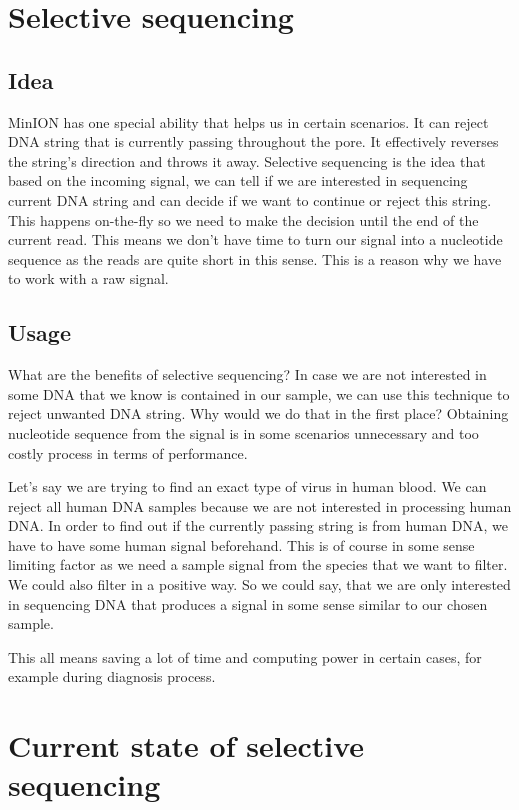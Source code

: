 \section{Selective sequencing}

\subsection{Idea}

MinION has one special ability that helps us in certain scenarios. It can reject
DNA string that is currently passing throughout the pore. It effectively reverses
the string’s direction and throws it away. Selective sequencing is the idea that
based on the incoming signal, we can tell if we are interested in sequencing current
DNA string and can decide if we want to continue or reject this string. This happens
on-the-fly so we need to make the decision until the end of the current read. This means
we don't have time to turn our signal into a nucleotide sequence as the reads are
quite short in this sense. This is a reason why we have to work with a raw signal.

\subsection{Usage}

What are the benefits of selective sequencing? In case we are not interested
in some DNA that we know is contained in our sample, we can use this technique to
reject unwanted DNA string. Why would we do that in the first place? Obtaining
nucleotide sequence from the signal is in some scenarios unnecessary and too
costly process in terms of performance. 

Let's say we are trying to find an exact type of virus in human blood. We can
reject all human DNA samples because we are not interested in processing human
DNA. In order to find out if the currently passing string is from human DNA, we
have to have some human signal beforehand. This is of course in some sense limiting
factor as we need a sample signal from the species that we want to filter. We could
also filter in a positive way. So we could say, that we are only interested in sequencing
DNA that produces a signal in some sense similar to our chosen sample.

This all means saving a lot of time and computing power in certain cases, for example
during diagnosis process.

\section{Current state of selective sequencing}
